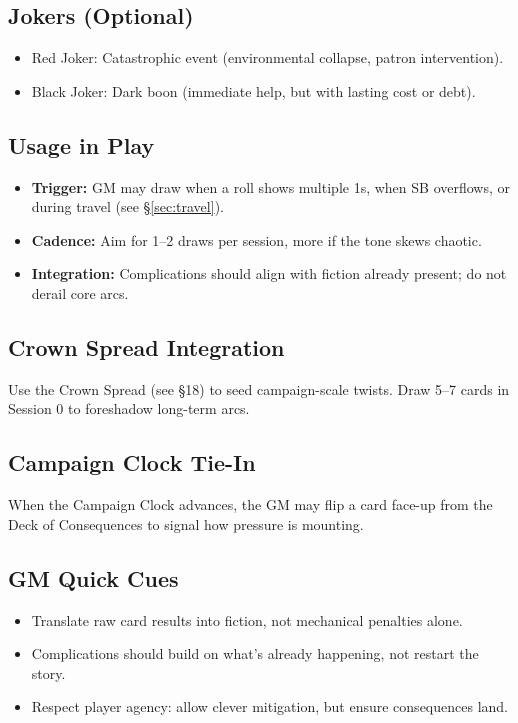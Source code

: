 \subsection{Jokers (Optional)}
\begin{itemize}
  \item Red Joker: Catastrophic event (environmental collapse, patron intervention).
  \item Black Joker: Dark boon (immediate help, but with lasting cost or debt).
\end{itemize}

\subsection{Usage in Play}
\begin{itemize}
  \item \textbf{Trigger:} GM may draw when a roll shows multiple 1s, when SB overflows, or during travel (see \S\ref{sec:travel}).
  \item \textbf{Cadence:} Aim for 1--2 draws per session, more if the tone skews chaotic.
  \item \textbf{Integration:} Complications should align with fiction already present; do not derail core arcs.
\end{itemize}

\subsection{Crown Spread Integration}
Use the Crown Spread (see \S18) to seed campaign-scale twists. Draw 5--7 cards in Session 0 to foreshadow long-term arcs.

\subsection{Campaign Clock Tie-In}
When the Campaign Clock advances, the GM may flip a card face-up from the Deck of Consequences to signal how pressure is mounting.

\subsection{GM Quick Cues}
\begin{itemize}
  \item Translate raw card results into fiction, not mechanical penalties alone.
  \item Complications should build on what’s already happening, not restart the story.
  \item Respect player agency: allow clever mitigation, but ensure consequences land.
\end{itemize}
